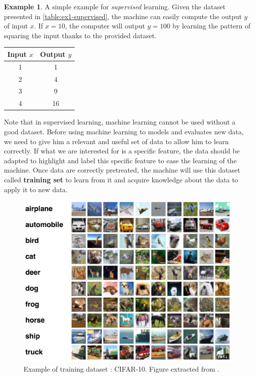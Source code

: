 \documentclass[11pt, openany]{report}
\theoremstyle{plain}
\theoremstyle{definition}
\newtheorem{exmp}{Example}[section]
\theoremstyle{remark}
\begin{document}
\begin{exmp}
A simple example for \textit{supervised} learning. Given the dataset presented in \autoref{table:ex1-supervised}, the machine can easily compute the output $y$ of input $x$. 
If $x = 10$, the computer will output $y = 100$ by learning the pattern of squaring the input thanks to the provided dataset.  

\newpage
\begin{center}
    \begin{tabular}{|c|c|}
      \hline
      Input $x$ & Output $y$ \\
      \hline
      1 & 1 \\
      \hline
      2 & 4 \\
      \hline
      3 & 9 \\
      \hline
      4 & 16 \\
      \hline
    \end{tabular}
    \label{table:ex1-supervised}
\end{center}
\end{exmp}

Note that in supervised learning, machine learning cannot be used without a good dataset. Before using machine learning to models and evaluates new data, we need to give him a relevant and useful set of data to allow him to learn correctly. If what we are interested for is a specific feature, the data should be adapted to highlight and label this specific feature to ease the learning of the machine. Once data are correctly pretreated, the machine will use this dataset called \textbf{training set} to learn from it and acquire knowledge about the data to apply it to new data.

\begin{figure}[h]
  \centering
  \includegraphics[scale=0.25]{figures/cifar10.png}
  \caption{Example of training dataset : CIFAR-10. Figure extracted from \cite{CIFAR10}.}
  \label{fig:cifar10}
\end{figure}
\end{document}
